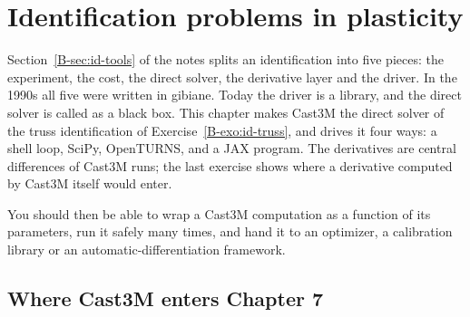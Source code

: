 \chapter{Identification problems in plasticity}\label{cc:ch7}


Section~\ref{B-sec:id-tools} of the notes splits an identification into five
pieces: the experiment, the cost, the direct solver, the derivative layer and
the driver. In the 1990s all five were written in gibiane. Today the driver is
a library, and the direct solver is called as a black box. This chapter makes
Cast3M the direct solver of the truss identification of
Exercise~\ref{B-exo:id-truss}, and drives it four ways: a shell loop, SciPy,
OpenTURNS, and a JAX program. The derivatives are central differences of Cast3M
runs; the last exercise shows where a derivative computed by Cast3M itself
would enter.

You should then be able to wrap a Cast3M computation as a function of its
parameters, run it safely many times, and hand it to an optimizer, a
calibration library or an automatic-differentiation framework.

\section{Where Cast3M enters Chapter 7}\label{cc:sec7-map}
%

